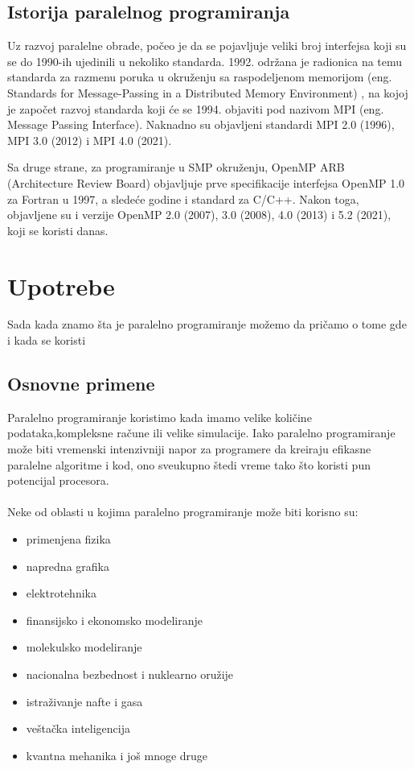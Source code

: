 \documentclass[a4paper]{article}
\begin{document}
{	\subsection{Istorija paralelnog programiranja}
	Uz razvoj paralelne obrade, počeo je da se pojavljuje veliki broj interfejsa koji su se do 1990-ih ujedinili u nekoliko standarda. 1992. održana je radionica na temu standarda za razmenu poruka u okruženju sa raspodeljenom memorijom (eng. Standards for Message-Passing in a Distributed Memory Environment) \cite{standardsformessagepassing}, na kojoj je započet razvoj standarda koji će se 1994. objaviti pod nazivom MPI (eng. Message Passing Interface). Naknadno su objavljeni standardi MPI 2.0 (1996), MPI 3.0 (2012) i MPI 4.0 (2021)\cite{mpidocs}.\par
	Sa druge strane, za programiranje u SMP okruženju, OpenMP ARB (Architecture Review Board) objavljuje prve specifikacije interfejsa OpenMP 1.0 za Fortran u 1997, a sledeće godine i standard za C/C++. Nakon toga, objavljene su i verzije OpenMP 2.0 (2007), 3.0 (2008), 4.0 (2013) i 5.2 (2021), koji se koristi danas\cite{opemp5}.
	
	\section{Upotrebe}
Sada kada znamo šta je paralelno programiranje možemo da pričamo o tome gde i kada se koristi
\subsection{Osnovne primene}

Paralelno programiranje koristimo kada imamo velike količine podataka,kompleksne račune ili velike simulacije. Iako paralelno programiranje može biti vremenski intenzivniji napor za programere da kreiraju efikasne paralelne algoritme i kod, ono sveukupno štedi vreme tako što koristi pun potencijal procesora.\\\\Neke od oblasti u kojima paralelno programiranje može biti korisno su:\\
\begin{itemize}
\item primenjena fizika\cite{totalview}
\item napredna grafika\cite{perforce}
\item elektrotehnika\cite{totalview}
\item finansijsko i ekonomsko modeliranje\cite{totalview}
\item molekulsko modeliranje\cite{totalview}
\item nacionalna bezbednost i nuklearno oružije\cite{totalview}
\item istraživanje nafte i gasa\cite{totalview}
\item veštačka inteligencija\cite{perforce}
\item kvantna mehanika\cite{totalview} i još mnoge druge
\end{itemize}\\

}
\end{document}
